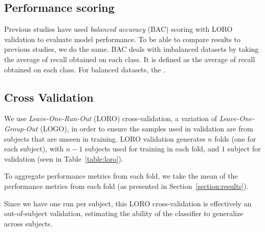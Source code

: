     \subsection{Performance scoring}

        Previous studies have used \emph{balanced accuracy} (BAC) scoring with LORO validation to evaluate model performance. To be able to compare results to previous studies, we do the same. BAC deals with imbalanced datasets by taking the average of recall obtained on each class. It is defined as the average of recall obtained on each class. For balanced datasets, the .

    \subsection{Cross Validation}

        We use \emph{Leave-One-Run-Out} (LORO) cross-validation, a variation of \emph{Leave-One-Group-Out} (LOGO), in order to ensure the samples used in validation are from subjects that are unseen in training. LORO validation generates $n$ folds (one for each subject), with $n-1$ subjects used for training in each fold, and $1$ subject for validation (seen in Table~\ref{table:loro}).

        

        To aggregate performance metrics from each fold, we take the mean of the performance metrics from each fold (as presented in Section~\ref{section:results}).

        Since we have one run per subject, this LORO cross-validation is effectively an out-of-subject validation, estimating the ability of the classifier to generalize across subjects.

